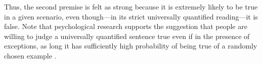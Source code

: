 \documentclass[pdfextras]{handbook}
\begin{document}
Thus, the second premise is felt as strong because it is extremely likely to be true in a given scenario, even though---in its strict universally quantified reading---it is false.
Note that psychological research supports the suggestion that people are willing to judge a universally quantified sentence true even if in the presence of exceptions, as long it has sufficiently high probability of being true of a randomly chosen example \citep{sloman98}.

%
%
\end{document}
